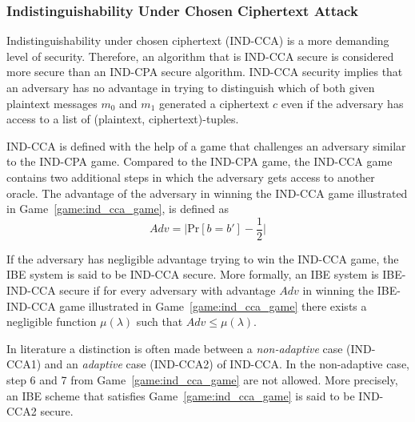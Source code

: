 \subsubsection{Indistinguishability Under Chosen Ciphertext Attack}
Indistinguishability under chosen ciphertext (IND-CCA) is a more demanding level of security. Therefore, an algorithm that is IND-CCA secure is considered more secure than an IND-CPA secure algorithm. IND-CCA security implies that an adversary has no advantage in trying to distinguish which of both given plaintext messages $m_0$ and $m_1$ generated a ciphertext $c$ even if the adversary has access to a list of (plaintext, ciphertext)-tuples.

IND-CCA is defined with the help of a game that challenges an adversary similar to the IND-CPA game. Compared to the IND-CPA game, the IND-CCA game contains two additional steps in which the adversary gets access to another oracle. %
The advantage of the adversary in winning the IND-CCA game illustrated in Game~\ref{game:ind_cca_game}, is defined as
\begin{equation*}
 Adv = \lvert \textrm{Pr} \left[ b = b' \right] - \frac{1}{2} \rvert
\end{equation*}

If the adversary has negligible advantage trying to win the IND-CCA game, the IBE system is said to be IND-CCA secure. More formally, an IBE system is IBE-IND-CCA secure if for every adversary with advantage $Adv$ in winning the IBE-IND-CCA game illustrated in Game~\ref{game:ind_cca_game} there exists a negligible function $\mu \left( \lambda \right)$ such that $Adv \leq \mu \left( \lambda \right)$.

In literature a distinction is often made between a \textit{non-adaptive} case (IND-CCA1) and an \textit{adaptive} case (IND-CCA2) of IND-CCA. In the non-adaptive case, step 6 and 7 from Game~\ref{game:ind_cca_game} are not allowed. More precisely, an IBE scheme that satisfies Game~\ref{game:ind_cca_game} is said to be IND-CCA2 secure.

